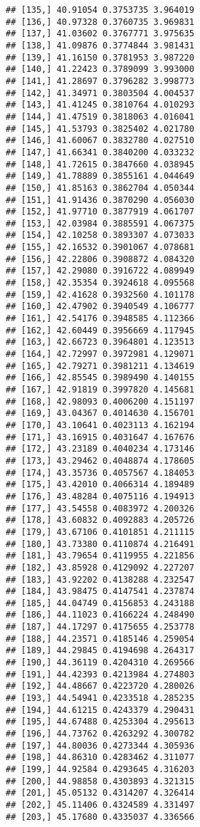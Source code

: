 \documentclass[]{book}
\theoremstyle{definition}
\theoremstyle{definition}
\theoremstyle{definition}
\theoremstyle{remark}
\begin{document}
\begin{verbatim}
## [135,] 40.91054 0.3753735 3.964019
## [136,] 40.97328 0.3760735 3.969831
## [137,] 41.03602 0.3767771 3.975635
## [138,] 41.09876 0.3774844 3.981431
## [139,] 41.16150 0.3781953 3.987220
## [140,] 41.22423 0.3789099 3.993000
## [141,] 41.28697 0.3796282 3.998773
## [142,] 41.34971 0.3803504 4.004537
## [143,] 41.41245 0.3810764 4.010293
## [144,] 41.47519 0.3818063 4.016041
## [145,] 41.53793 0.3825402 4.021780
## [146,] 41.60067 0.3832780 4.027510
## [147,] 41.66341 0.3840200 4.033232
## [148,] 41.72615 0.3847660 4.038945
## [149,] 41.78889 0.3855161 4.044649
## [150,] 41.85163 0.3862704 4.050344
## [151,] 41.91436 0.3870290 4.056030
## [152,] 41.97710 0.3877919 4.061707
## [153,] 42.03984 0.3885591 4.067375
## [154,] 42.10258 0.3893307 4.073033
## [155,] 42.16532 0.3901067 4.078681
## [156,] 42.22806 0.3908872 4.084320
## [157,] 42.29080 0.3916722 4.089949
## [158,] 42.35354 0.3924618 4.095568
## [159,] 42.41628 0.3932560 4.101178
## [160,] 42.47902 0.3940549 4.106777
## [161,] 42.54176 0.3948585 4.112366
## [162,] 42.60449 0.3956669 4.117945
## [163,] 42.66723 0.3964801 4.123513
## [164,] 42.72997 0.3972981 4.129071
## [165,] 42.79271 0.3981211 4.134619
## [166,] 42.85545 0.3989490 4.140155
## [167,] 42.91819 0.3997820 4.145681
## [168,] 42.98093 0.4006200 4.151197
## [169,] 43.04367 0.4014630 4.156701
## [170,] 43.10641 0.4023113 4.162194
## [171,] 43.16915 0.4031647 4.167676
## [172,] 43.23189 0.4040234 4.173146
## [173,] 43.29462 0.4048874 4.178605
## [174,] 43.35736 0.4057567 4.184053
## [175,] 43.42010 0.4066314 4.189489
## [176,] 43.48284 0.4075116 4.194913
## [177,] 43.54558 0.4083972 4.200326
## [178,] 43.60832 0.4092883 4.205726
## [179,] 43.67106 0.4101851 4.211115
## [180,] 43.73380 0.4110874 4.216491
## [181,] 43.79654 0.4119955 4.221856
## [182,] 43.85928 0.4129092 4.227207
## [183,] 43.92202 0.4138288 4.232547
## [184,] 43.98475 0.4147541 4.237874
## [185,] 44.04749 0.4156853 4.243188
## [186,] 44.11023 0.4166224 4.248490
## [187,] 44.17297 0.4175655 4.253778
## [188,] 44.23571 0.4185146 4.259054
## [189,] 44.29845 0.4194698 4.264317
## [190,] 44.36119 0.4204310 4.269566
## [191,] 44.42393 0.4213984 4.274803
## [192,] 44.48667 0.4223720 4.280026
## [193,] 44.54941 0.4233518 4.285235
## [194,] 44.61215 0.4243379 4.290431
## [195,] 44.67488 0.4253304 4.295613
## [196,] 44.73762 0.4263292 4.300782
## [197,] 44.80036 0.4273344 4.305936
## [198,] 44.86310 0.4283462 4.311077
## [199,] 44.92584 0.4293645 4.316203
## [200,] 44.98858 0.4303893 4.321315
## [201,] 45.05132 0.4314207 4.326414
## [202,] 45.11406 0.4324589 4.331497
## [203,] 45.17680 0.4335037 4.336566

\end{verbatim}
\end{document}
